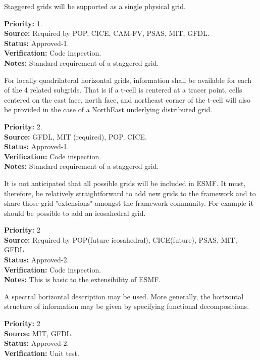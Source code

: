 Staggered grids will be supported as a single physical grid.
\begin{reqlist}
{\bf Priority:} 1. \\
{\bf Source:} Required by POP, CICE, CAM-FV, PSAS, MIT, GFDL.  \\
{\bf Status:} Approved-1. \\
{\bf Verification:} Code inspection.\\
{\bf Notes:} Standard requirement of a staggered grid.
\end{reqlist}

For locally quadrilateral horizontal grids, information shall be available for
each of the 4 related subgrids.  That is if a t-cell is centered at a tracer
point,  cells centered on the east face, north face, and northeast corner of
the t-cell will also be provided in the case of a NorthEast underlying
distributed grid.
\begin{reqlist}
{\bf Priority:} 2. \\
{\bf Source:} GFDL, MIT (required), POP, CICE. \\
{\bf Status:} Approved-1. \\
{\bf Verification:} Code inspection.\\
{\bf Notes:} Standard requirement of a staggered grid.
\end{reqlist}

It is not anticipated that all possible grids will be included in
ESMF. It must, therefore, be relatively straightforward to add
new grids to the framework and to share those grid "extensions"
amongst the framework community. For example it should be possible
to add an icosahedral grid.
\begin{reqlist}
{\bf Priority:} 2\\
{\bf Source:} Required by POP(future icosahedral), CICE(future), 
PSAS, MIT, GFDL.  \\
{\bf Status:} Approved-2. \\
{\bf Verification:} Code inspection. \\
{\bf Notes:} This is basic to the extensibility of ESMF.
\end{reqlist}


A spectral horizontal description may be used.  More generally, the horizontal
structure of information may be given by specifying functional decompositions.
\begin{reqlist}
{\bf Priority:} 2 \\
{\bf Source:} MIT, GFDL.  \\
{\bf Status:} Approved-2. \\
{\bf Verification:} Unit test.
\end{reqlist}

